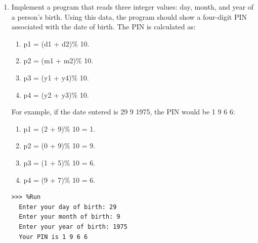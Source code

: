 \documentclass[
  fontsize=10pt,
  a4paper,
]{scrartcl}
\newenvironment{howTILEd}%
  {\begin{mdframed}[skipabove=10pt,skipbelow=10pt,backgroundcolor=pink!40]}%
  {\end{mdframed}}
\begin{document}
\begin{enumerate}
 {\tt i = 2
 
 f1 = 123.456
 
 f2 = 12345.67
 
 out = True
 
 result = PASS}

your program should produce:

\verb|TEST_ID_002 --- inputs: 1.23e+02, 1.23e+04 --- output: True --- result: PASS|

The first part of the string is used to classify test cases: it always has to start with \verb|'test_ID_'| followed by an identifier of maximum 3 digits. If {\tt i} has fewer digits then it must be filled with leading zeros.

Floats must be presented in scientific format.

You have to do 2 different implementations of your program. One using the String module operator \% to format, and another with the \verb|str.format()|.

\begin{howTILEd}
This exercise is about creating strings that have certain patterns using string manipulation. It used to be about file names, it was TILEd by making it about test cases and their components.
\end{howTILEd}


\item Implement a program that reads three integer values: day, month, and year of a person's birth. Using this data, the program should show a four-digit PIN associated with the date of birth. The PIN is calculated as:

\begin{enumerate}
    \item p1 = (d1 + d2)\% 10.
    \item p2 = (m1 + m2)\% 10.
    \item p3 = (y1 + y4)\% 10.
    \item p4 = (y2 + y3)\% 10.
\end{enumerate}
For example, if the date entered is 29 9 1975, the PIN would be 1 9 6 6:
\begin{enumerate}
    \item p1 = (2 + 9)\% 10 = 1.
    \item p2 = (0 + 9)\% 10 = 9.
    \item p3 = (1 + 5)\% 10 = 6.
    \item p4 = (9 + 7)\% 10 = 6.
\end{enumerate}

\begin{Verbatim}[frame=single, label={\em example test execution of the program}]
>>> %Run 
  Enter your day of birth: 29
  Enter your month of birth: 9
  Enter your year of birth: 1975
  Your PIN is 1 9 6 6 
\end{Verbatim}



\end{enumerate}
\end{document}

